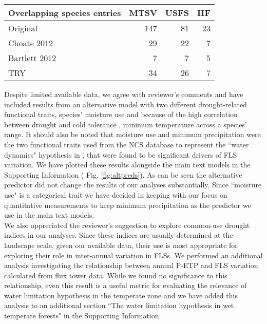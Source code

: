 \documentclass{article}[11pt]
\begin{document}
\begin{table}[ht]
\centering
\begin{tabular}{lrrr}
  \hline
  Overlapping species entries & MTSV & USFS & HF \\ 
  \hline
 Original & 147 &  81 &  23 \\ 
 Choate 2012 &  29 &  22 &   7 \\ 
 Bartlett 2012 &   7 &   7 &   5 \\ 
 TRY &  34 &  26 &   7 \\ 
   \hline
\end{tabular}
\end{table}

\noindent Despite limited available data, we agree with reviewer's comments and have included results from an alternative model with two different drought-related functional traits, species' moisture use and because of the high correlation between drought and cold tolerance \citep{Zanne2013}, minimum temperature across a species' range. It should also be noted that moisture use and minimum precipitation were the two functional traits used from the NCS database to represent the ``water dynamics" hypothesis in \citet{Gougherty2018}, that were found to be significant drivers of FLS variation. We have plotted these results alongside the main text models in the Supporting Information ( Fig. \ref{fig:altpreds}). As can be seen the alternative predictor did not change the results of our analyses substantially. Since ``moisture use" is a categorical trait we have decided in keeping with our focus on quantitative measurements to keep minimum precipitation as the predictor we use in the main text models.  \\

\noindent We also appreciated the reviewer's suggestion to explore common-use drought indices in our analyses. Since these indices are usually determined at the landscape scale, given our available data, their use is most appropriate for exploring their role in inter-annual variation in FLSs. We performed an additional analysis investigating the relationship between annual P-ETP and FLS variation calculated from flux tower data. While we found no significance to this relationship, even this result is a useful metric for evaluating the relevance of water limitation hypothesis in the temperate zone  and we have added this analysis to an additional section ``The water limitation hypothesis in wet temperate forests" in the Supporting Information.\\
\end{document}

